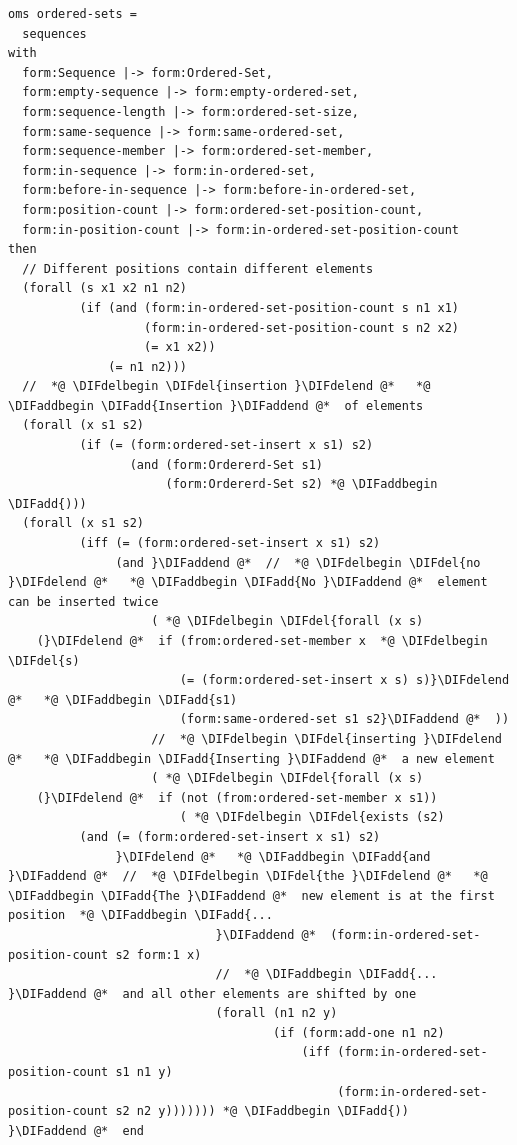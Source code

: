 \documentclass[10pt,fleqn,final]{scrreprt}
\newenvironment{definitions}[0]{\medskip }{}
\providecommand{\DIFadd}[1]{{\protect\color{blue}\uwave{#1}}} %
\providecommand{\DIFdel}[1]{{\protect\color{red}\sout{#1}}}                      %
\providecommand{\DIFaddbegin}{} %
\providecommand{\DIFaddend}{} %
\providecommand{\DIFdelbegin}{} %
\providecommand{\DIFdelend}{} %
\begin{document}
\begin{definitions}
\begin{lstlisting}[language=clif,morekeywords={then,with,logic,oms,end},mathescape]
oms ordered-sets =
  sequences
with
  form:Sequence |-> form:Ordered-Set,
  form:empty-sequence |-> form:empty-ordered-set,
  form:sequence-length |-> form:ordered-set-size,
  form:same-sequence |-> form:same-ordered-set,
  form:sequence-member |-> form:ordered-set-member,
  form:in-sequence |-> form:in-ordered-set,
  form:before-in-sequence |-> form:before-in-ordered-set,
  form:position-count |-> form:ordered-set-position-count,
  form:in-position-count |-> form:in-ordered-set-position-count
then
  // Different positions contain different elements
  (forall (s x1 x2 n1 n2)
          (if (and (form:in-ordered-set-position-count s n1 x1)
                   (form:in-ordered-set-position-count s n2 x2)
                   (= x1 x2))
              (= n1 n2)))
  //  *@ \DIFdelbegin \DIFdel{insertion }\DIFdelend @*   *@ \DIFaddbegin \DIFadd{Insertion }\DIFaddend @*  of elements
  (forall (x s1 s2)
          (if (= (form:ordered-set-insert x s1) s2)
                 (and (form:Ordererd-Set s1)
                      (form:Ordererd-Set s2) *@ \DIFaddbegin \DIFadd{)))
  (forall (x s1 s2)
          (iff (= (form:ordered-set-insert x s1) s2)
               (and }\DIFaddend @*  //  *@ \DIFdelbegin \DIFdel{no }\DIFdelend @*   *@ \DIFaddbegin \DIFadd{No }\DIFaddend @*  element can be inserted twice
                    ( *@ \DIFdelbegin \DIFdel{forall (x s)
    (}\DIFdelend @*  if (from:ordered-set-member x  *@ \DIFdelbegin \DIFdel{s)
                        (= (form:ordered-set-insert x s) s)}\DIFdelend @*   *@ \DIFaddbegin \DIFadd{s1)
                        (form:same-ordered-set s1 s2}\DIFaddend @*  ))
                    //  *@ \DIFdelbegin \DIFdel{inserting }\DIFdelend @*   *@ \DIFaddbegin \DIFadd{Inserting }\DIFaddend @*  a new element
                    ( *@ \DIFdelbegin \DIFdel{forall (x s)
    (}\DIFdelend @*  if (not (from:ordered-set-member x s1))
                        ( *@ \DIFdelbegin \DIFdel{exists (s2)
          (and (= (form:ordered-set-insert x s1) s2)     
               }\DIFdelend @*   *@ \DIFaddbegin \DIFadd{and }\DIFaddend @*  //  *@ \DIFdelbegin \DIFdel{the }\DIFdelend @*   *@ \DIFaddbegin \DIFadd{The }\DIFaddend @*  new element is at the first position  *@ \DIFaddbegin \DIFadd{...
                             }\DIFaddend @*  (form:in-ordered-set-position-count s2 form:1 x)
                             //  *@ \DIFaddbegin \DIFadd{... }\DIFaddend @*  and all other elements are shifted by one
                             (forall (n1 n2 y)
                                     (if (form:add-one n1 n2)
                                         (iff (form:in-ordered-set-position-count s1 n1 y)
                                              (form:in-ordered-set-position-count s2 n2 y))))))) *@ \DIFaddbegin \DIFadd{))
}\DIFaddend @*  end


\end{lstlisting}
\end{definitions}
\end{document}
